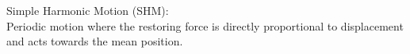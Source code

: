 \documentclass[preview]{standalone}
\begin{document}
\begin{center}
Simple Harmonic Motion (SHM):\\Periodic motion where the restoring force is directly proportional to displacement\\and acts towards the mean position.
\end{center}
\end{document}
